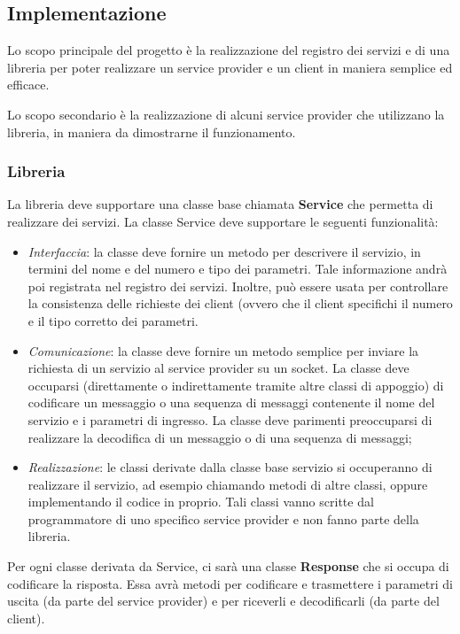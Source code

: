 \documentclass[a4paper,twoside]{article}
\begin{document}
\subsection{Implementazione}

Lo scopo principale del progetto è la realizzazione del registro dei servizi e di una libreria per poter realizzare un service provider e un client in maniera semplice ed efficace.

Lo scopo secondario è la realizzazione di alcuni service provider che utilizzano la
libreria, in maniera da dimostrarne il funzionamento.

\subsubsection{Libreria}
La libreria deve supportare una classe base chiamata \textbf{Service} che permetta di realizzare
dei servizi. La classe Service deve supportare le seguenti funzionalità:
\begin{itemize}
\item \emph{Interfaccia}: la classe deve fornire un metodo per descrivere il servizio, in termini del nome e del numero e tipo dei parametri. Tale informazione andrà poi registrata nel registro dei servizi. Inoltre, può essere usata per controllare la consistenza delle richieste dei client (ovvero che il client specifichi il numero e il tipo corretto dei parametri.
\item \emph{Comunicazione}: la classe deve fornire un metodo semplice per inviare la richiesta di un servizio al service provider su un socket. La classe deve occuparsi (direttamente o indirettamente tramite altre classi di appoggio) di codificare un messaggio o una sequenza di messaggi contenente il nome del servizio e i parametri di ingresso. La classe deve parimenti preoccuparsi di realizzare la decodifica di un messaggio o di una sequenza di messaggi;
\item \emph{Realizzazione}: le classi derivate dalla classe base servizio si occuperanno di realizzare il servizio, ad esempio chiamando metodi di altre classi, oppure implementando il codice in proprio. Tali classi vanno scritte dal programmatore di uno specifico service provider e non fanno parte della libreria.
\end{itemize}

Per ogni classe derivata da Service, ci sarà una classe \textbf{Response} che si occupa di codificare la risposta. Essa avrà metodi per codificare e trasmettere i parametri di uscita (da parte del service provider) e per riceverli e decodificarli (da parte del client).
\end{document}
